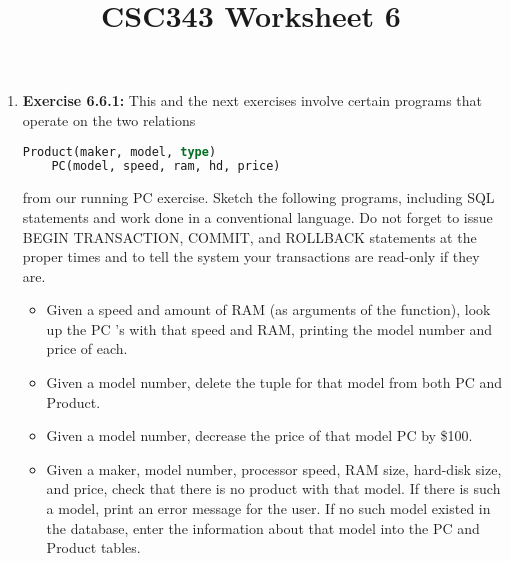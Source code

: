\documentclass[12pt]{article}
\begin{document}
\title{CSC343 Worksheet 6}
\maketitle

\begin{enumerate}[1.]
    \item \textbf{Exercise 6.6.1:} This and the next exercises involve certain
    programs that operate on the two relations

    \begin{lstlisting}[language=SQL]
    Product(maker, model, type)
    PC(model, speed, ram, hd, price)
    \end{lstlisting}

    \bigskip

    from our running PC exercise. Sketch the following programs, including SQL
    statements and work done in a conventional language. Do not forget to issue
    BEGIN TRANSACTION, COMMIT, and ROLLBACK statements at the proper times
    and to tell the system your transactions are read-only if they are.

    \bigskip

    \begin{itemize}
        \item Given a speed and amount of RAM (as arguments of the function), look up the PC ’s with that speed and RAM, printing the model number and price of each.
        \item Given a model number, delete the tuple for that model from both PC and Product.
        \item Given a model number, decrease the price of that model PC by \$100.
        \item Given a maker, model number, processor speed, RAM size, hard-disk size, and price, check that there is no product with that model. If there is such a model, print an error message for the user. If no such model existed in the database, enter the information about that model into the PC and Product tables.
    \end{itemize}

\end{enumerate}
\end{document}
